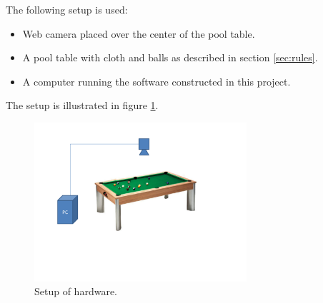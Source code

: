 The following setup is used:
\begin{itemize}
	\item Web camera placed over the center of the pool table.
	\item A pool table with cloth and balls as described in section \ref{sec:rules}.
	\item A computer running the software constructed in this project.
\end{itemize}

The setup is illustrated in figure \ref{fig:setup}.

\begin{figure}[htpb]
\begin{center}
\leavevmode
\includegraphics[width=0.7\textwidth]{images/setup}
\end{center}
\caption{Setup of hardware.}
\label{fig:setup}
\end{figure}